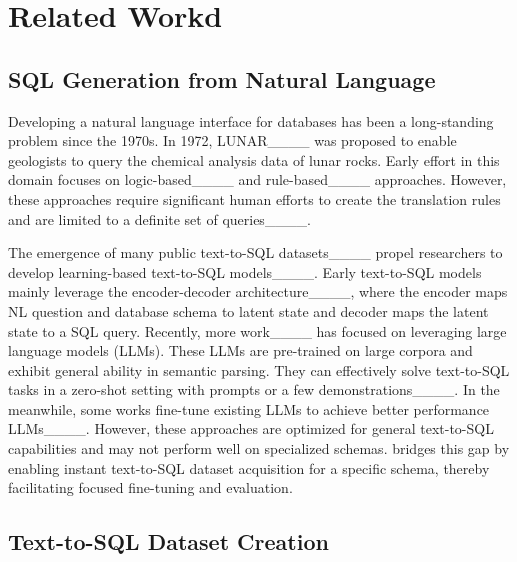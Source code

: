 \section{Related Workd}
\subsection{SQL Generation from Natural Language}



Developing a natural language interface for databases has been a long-standing problem since the 1970s. In 1972,  LUNAR____ was proposed to enable geologists to query the chemical analysis data of lunar rocks. 
Early effort in this domain focuses on logic-based____ and rule-based____ approaches. However, these approaches require significant human efforts to create the translation rules and are limited to a definite set of queries____.

The emergence of many public text-to-SQL datasets____ propel researchers to develop learning-based text-to-SQL models____.
Early text-to-SQL models mainly leverage the encoder-decoder architecture____, where the encoder maps NL question and database schema to latent state and decoder maps the latent state to a SQL query. 
Recently, more work____ has focused on leveraging large language models (LLMs).
These LLMs are pre-trained on large corpora and exhibit general ability in semantic parsing. 
They can effectively solve text-to-SQL tasks in a zero-shot setting with prompts or a few demonstrations____.
In the meanwhile, some works fine-tune existing LLMs to achieve better performance LLMs____. However, these approaches are optimized for general text-to-SQL capabilities and may not perform well on specialized schemas. {\tool} bridges this gap by enabling instant text-to-SQL dataset acquisition for a specific schema, thereby facilitating focused fine-tuning and evaluation.


\subsection{Text-to-SQL Dataset Creation}

